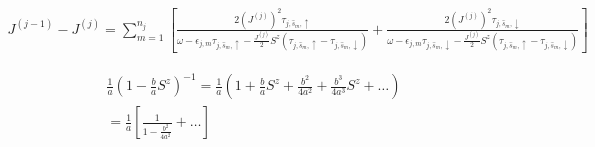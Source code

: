 \documentclass[11pt,a4paper]{article}
\begin{document}
\begin{eqnarray}
J^{(j-1)}-J^{(j)}=\sum_{m=1}^{n_{j}}\left[\frac{2(J^{(j)})^{2}\tau_{j,\hat{s}_{m},\uparrow}}{\omega-\epsilon_{j,m}\tau_{j,\hat{s}_{m},\uparrow}-\frac{J^{(j)}}{2}S^{z}(\tau_{j,\hat{s}_{m},\uparrow}-\tau_{j,\hat{s}_{m},\downarrow})}+\frac{2(J^{(j)})^{2}\tau_{j,\hat{s}_{m},\downarrow}}{\omega-\epsilon_{j,m}\tau_{j,\hat{s}_{m},\downarrow}-\frac{J^{(j)}}{2}S^{z}(\tau_{j,\hat{s}_{m},\uparrow}-\tau_{j,\hat{s}_{m},\downarrow})}\right]
\end{eqnarray}

\begin{eqnarray}
\frac{1}{a}\left(1-\frac{b}{a}S^{z}\right)^{-1}=\frac{1}{a}\left(1+\frac{b}{a}S^{z}+\frac{b^{2}}{4a^{2}}+\frac{b^{3}}{4a^{3}}S^{z}+\ldots\right)\nonumber\\
=\frac{1}{a}\left[\frac{1}{1-\frac{b^{2}}{4a^{2}}}+\ldots\right]
\end{eqnarray}
\end{document}

